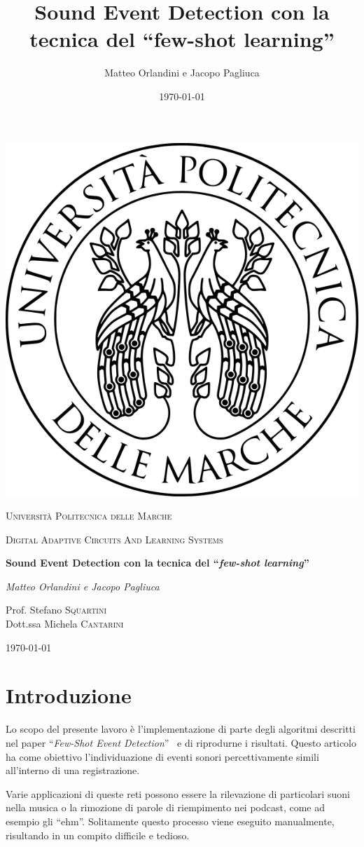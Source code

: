 \documentclass[12pt,a4paper,titlepage]{article}
\title{Sound Event Detection con la tecnica del ``few-shot learning''}
\author{Matteo Orlandini e Jacopo Pagliuca}
\date{\today}
\begin{document}
\begin{titlepage}
	
	\centering
	\includegraphics[width=.2\textwidth]{Immagini/univpmlogo}\par\vspace{1cm}
	{\scshape\LARGE Università Politecnica delle Marche\par}
	\vspace{1cm}
	{\scshape\Large Digital Adaptive Circuits And Learning Systems\par}
	\vspace{1.5cm}
	{\huge\bfseries Sound Event Detection con la tecnica del  ``\textit{few-shot learning}''  \par}
	\vspace{2cm}
	{\Large\itshape Matteo Orlandini e Jacopo Pagliuca\par}
	\vfill
	Prof. Stefano \textsc{Squartini}\\
	Dott.ssa Michela \textsc{Cantarini}
	
	\vfill
	
	{\large \today\par}
\end{titlepage}

\thispagestyle{empty}
\tableofcontents
\clearpage

\setcounter{page}{1}

\section{Introduzione}
\label{sec:introduzione}
Lo scopo del presente lavoro è l'implementazione di parte degli algoritmi descritti nel paper  ``\textit{Few-Shot Event Detection}''~\cite{salamon:Few-Shot} e di riprodurne i risultati. Questo articolo ha come obiettivo l'individuazione di eventi sonori percettivamente simili all'interno di una registrazione.

Varie applicazioni di queste reti possono essere la rilevazione di particolari suoni nella musica o la rimozione di parole di riempimento nei podcast, come ad esempio gli ``ehm''. Solitamente questo processo viene eseguito manualmente, risultando in un compito difficile e tedioso.
\end{document}

